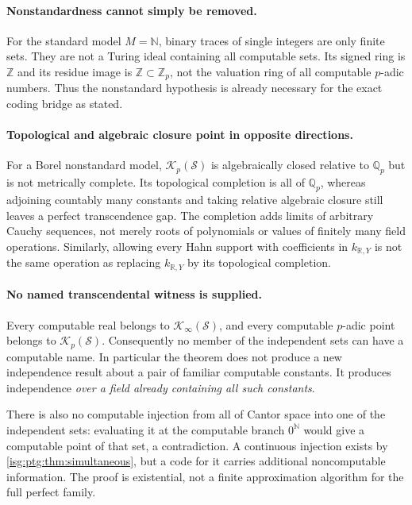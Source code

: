 \documentclass[11pt]{article}
\theoremstyle{definition}
\theoremstyle{remark}
\newcommand{\R}{\mathbb{R}}
\newcommand{\Z}{\mathbb{Z}}
\newcommand{\N}{\mathbb{N}}
\newcommand{\Qp}{\mathbb{Q}_p}
\newcommand{\Zp}{\mathbb{Z}_p}
\begin{document}
\paragraph{Nonstandardness cannot simply be removed.} For the standard
model $M=\N$, binary traces of single integers are only finite sets. They
are not a Turing ideal containing all computable sets. Its signed ring is
$\Z$ and its residue image is $\Z\subset\Zp$, not the valuation ring of all
computable $p$-adic numbers. Thus the nonstandard hypothesis is already
necessary for the exact coding bridge as stated.

\paragraph{Topological and algebraic closure point in opposite
directions.} For a Borel nonstandard model, $\mathcal K_p(\mathcal S)$ is
algebraically closed relative to $\Qp$ but is not metrically complete. Its
topological completion is all of $\Qp$, whereas adjoining countably many
constants and taking relative algebraic closure still leaves a perfect
transcendence gap. The completion adds limits of arbitrary Cauchy
sequences, not merely roots of polynomials or values of finitely many field
operations. Similarly, allowing every Hahn support with coefficients in
$k_{\R,Y}$ is not the same operation as replacing $k_{\R,Y}$ by its
topological completion.

\paragraph{No named transcendental witness is supplied.} Every computable
real belongs to $\mathcal K_\infty(\mathcal S)$, and every computable
$p$-adic point belongs to $\mathcal K_p(\mathcal S)$. Consequently no member
of the independent sets can have a computable name. In particular the
theorem does not produce a new independence result about a pair of
familiar computable constants. It produces independence \emph{over a field
already containing all such constants}.

There is also no computable injection from all of Cantor space into one of
the independent sets: evaluating it at the computable branch $0^\N$ would
give a computable point of that set, a contradiction. A continuous
injection exists by \cref{isg:ptg:thm:simultaneous}, but a code for it
carries additional noncomputable information. The proof is existential,
not a finite approximation algorithm for the full perfect family.
\end{document}
